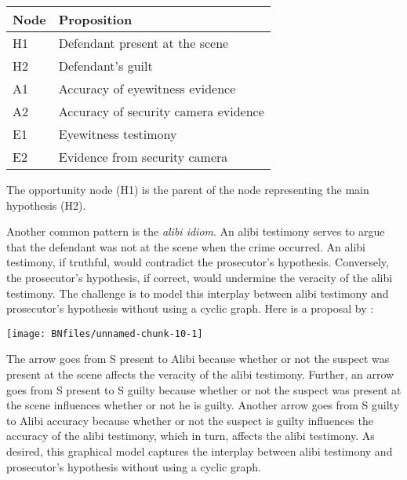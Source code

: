 \documentclass{article}
\begin{document}
\begin{center}
\begin{tabular}{@{}ll@{}}
\toprule
Node &  Proposition\\
\midrule
H1 &  Defendant present at the scene \\
H2 &  Defendant's guilt \\
A1 & Accuracy of eyewitness evidence\\
A2 & Accuracy of security camera evidence \\
E1 & Eyewitness testimony \\
E2 & Evidence from security camera\\
\bottomrule
\end{tabular}
\end{center}

\noindent
The opportunity node (H1) is the parent of the node representing the main hypothesis (H2).  

Another common pattern is the \emph{alibi idiom}. An alibi testimony serves to argue that the defendant was not at the  scene when the crime occurred. %
An alibi testimony, if truthful, would contradict the prosecutor's hypothesis. Conversely, the prosecutor's hypothesis, if correct, would undermine the veracity of the alibi testimony.
The challenge is to model this interplay between alibi testimony and prosecutor's hypothesis without using a cyclic graph. Here is a proposal by \cite{lagnado2013legal}: 

\begin{center}\texttt{[image: BNfiles/unnamed-chunk-10-1]} \end{center}

\noindent
The arrow goes from \textsf{S present} to \textsf{Alibi} because whether or not the suspect was present at the scene affects the veracity of the alibi testimony. Further, an arrow goes from \textsf{S present} to \textsf{S guilty} because whether or not the suspect was present at the scene influences whether or not he is guilty. Another arrow goes from \textsf{S guilty} to \textsf{Alibi accuracy} because whether or not the suspect is guilty influences the accuracy of the alibi testimony, which in turn, affects the alibi testimony. As desired, this graphical model captures  the interplay between alibi testimony and prosecutor's hypothesis without using a cyclic graph.
\end{document}
